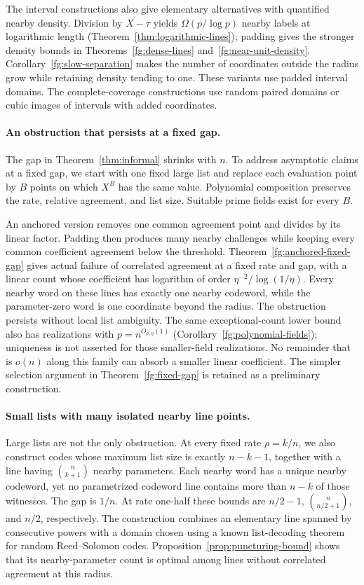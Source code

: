 \documentclass[11pt,letterpaper]{article}
\theoremstyle{definition}
\theoremstyle{remark}
\begin{document}
The interval constructions also give elementary alternatives with
quantified nearby density. Division by $X-\tau$ yields
$\Omega(p/\log p)$ nearby labels at logarithmic length
(Theorem~\ref{thm:logarithmic-lines}); padding gives the stronger density
bounds in Theorems~\ref{fg:dense-lines} and~\ref{fg:near-unit-density}.
Corollary~\ref{fg:slow-separation} makes the number of coordinates outside
the radius grow while retaining density tending to one. These variants
use padded interval domains. The complete-coverage constructions use
random paired domains or cubic images of intervals with added coordinates.

\paragraph{An obstruction that persists at a fixed gap.}
The gap in Theorem~\ref{thm:informal} shrinks with $n$. To address
asymptotic claims at a fixed gap, we start with one fixed large list
and replace each evaluation point by $B$ points on which $X^B$ has
the same value. Polynomial composition preserves the rate, relative
agreement, and list size. Suitable prime fields exist for every $B$.

An anchored version removes one common agreement point and divides by
its linear factor. Padding then produces many nearby challenges while
keeping every common coefficient agreement below the threshold.
Theorem~\ref{fg:anchored-fixed-gap} gives actual failure of correlated
agreement at a fixed rate and gap, with a linear count whose coefficient
has logarithm of order $\eta^{-2}/\log(1/\eta)$.
Every nearby word on these lines has exactly one nearby codeword,
while the parameter-zero word is one coordinate beyond the radius.
The obstruction persists without local list ambiguity.
The same exceptional-count lower bound also has realizations with
$p=n^{O_{\rho,\eta}(1)}$ (Corollary~\ref{fg:polynomial-fields});
uniqueness is not asserted for those smaller-field realizations.
No remainder that is $o(n)$ along this family can absorb a smaller
linear coefficient. The simpler selection argument in
Theorem~\ref{fg:fixed-gap} is retained as a preliminary construction.

\paragraph{Small lists with many isolated nearby line points.}
Large lists are not the only obstruction. At every fixed rate $\rho=k/n$,
we also construct codes whose maximum list size is exactly $n-k-1$,
together with a line having $\binom n{k+1}$ nearby parameters. Each
nearby word has a unique nearby codeword, yet no parametrized codeword
line contains more than $n-k$ of those witnesses. The gap is $1/n$.
At rate one-half these bounds are $n/2-1$, $\binom n{n/2+1}$, and $n/2$,
respectively. The construction combines
an elementary line spanned by consecutive powers with a domain chosen
using a known list-decoding theorem for random Reed--Solomon codes.
Proposition~\ref{prop:puncturing-bound} shows that its nearby-parameter
count is optimal among lines without correlated agreement at this radius.
\end{document}
